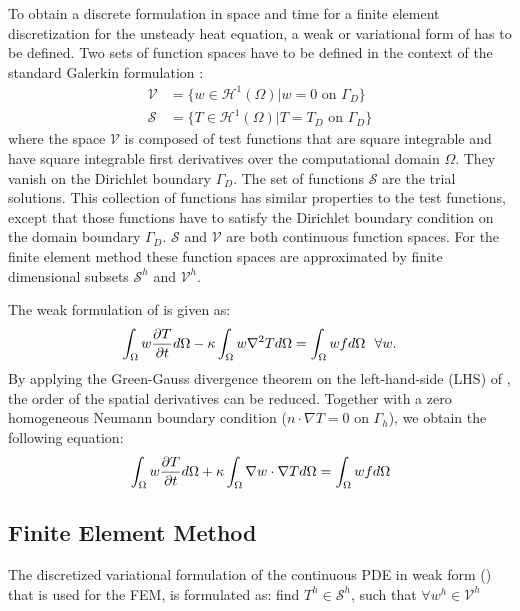 To obtain a discrete formulation in space and time for a finite element discretization for the unsteady heat equation, a weak or variational form of  has to be defined. Two sets of function spaces have to be defined in the context of the standard Galerkin formulation \cite{doneaFiniteElementMethods2003}:
\begin{align}
	\mathcal{V} &= \{w \in \mathcal{H}^1(\Omega) | w = 0 \text{ on } \Gamma_D\}\\
	\mathcal{S} &= \{T \in \mathcal{H}^1(\Omega) | T = T_D \text{ on } \Gamma_D\}
\end{align}
where the space $\mathcal{V}$ is composed of test functions that are square integrable and have square integrable first derivatives over the computational domain $\Omega$. They vanish on the Dirichlet boundary $\Gamma_D$. The set of functions $\mathcal{S}$ are the trial solutions. This collection of functions has similar properties to the test functions, except that those functions have to satisfy the Dirichlet boundary condition on the domain boundary $\Gamma_D$. $\mathcal{S}$ and $\mathcal{V}$ are both continuous function spaces. For the finite element method these function spaces are approximated by finite dimensional subsets $\mathcal{S}^h$ and $\mathcal{V}^h$.

The weak formulation of  is given as:
\begin{equation}
	\label{eq:weak}
	\int_{\Omega} w\frac{\partial T}{\partial t} d\Omega - \kappa \int_{\Omega} w \nabla^2 T d\Omega = \int_{\Omega}w f d\Omega \ \ \forall w .
\end{equation}
By applying the Green-Gauss divergence theorem on the left-hand-side (LHS) of , the order of the spatial derivatives can be reduced. Together with a zero homogeneous Neumann boundary condition ($n \cdot \nabla T = 0 \text{ on } \Gamma_h$), we obtain the following equation:
\begin{equation}
	\label{eq:weak2}
	\int_{\Omega}w\frac{\partial T}{\partial t} d\Omega + \kappa \int_{\Omega} \nabla w \cdot \nabla T d\Omega = \int_{\Omega} w f d\Omega
\end{equation}

\subsection{Finite Element Method}

The discretized variational formulation of the continuous PDE in weak form ()  that is used for the FEM, is formulated as: find $T^h \in \mathcal{S}^h$, such that $\forall w^h \in \mathcal{V}^h$

